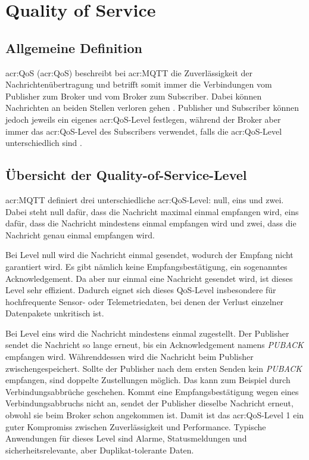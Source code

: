 \section{Quality of Service}
    \subsection{Allgemeine Definition}
        \acrlong{acr:QoS} (\acrshort{acr:QoS}) beschreibt bei \acrshort{acr:MQTT} die Zuverlässigkeit der Nachrichtenübertragung und betrifft somit immer die Verbindungen vom Publisher zum Broker und vom Broker zum Subscriber.
        Dabei können Nachrichten an beiden Stellen verloren gehen \autocite[22]{hivemqMQTTMQTT5}. Publisher und Subscriber können jedoch jeweils ein eigenes \acrshort{acr:QoS}-Level festlegen, während der Broker aber immer das \acrshort{acr:QoS}-Level des Subscribers verwendet, 
        falls die \acrshort{acr:QoS}-Level unterschiedlich sind \autocite[25]{hivemqMQTTMQTT5}. 
  
    \subsection{Übersicht der Quality-of-Service-Level}
        \acrshort{acr:MQTT} definiert drei unterschiedliche \acrshort{acr:QoS}-Level: null, eins und zwei. Dabei steht null dafür, dass die Nachricht maximal einmal empfangen wird, eins dafür, dass die Nachricht mindestens einmal empfangen wird und zwei, dass die Nachricht genau einmal empfangen wird. \autocite[120--122]{angewandteNetzwerktechnik}

        Bei Level null wird die Nachricht einmal gesendet, wodurch der Empfang nicht garantiert wird. Es gibt nämlich keine Empfangsbestätigung, ein sogenanntes Acknowledgement. Da aber nur einmal eine Nachricht gesendet wird, ist dieses Level sehr effizient. 
       Dadurch eignet sich dieses QoS-Level insbesondere für hochfrequente Sensor- oder Telemetriedaten, bei denen der Verlust einzelner Datenpakete unkritisch ist. \autocite[22]{hivemqMQTTMQTT5}

        Bei Level eins wird die Nachricht mindestens einmal zugestellt. Der Publisher sendet die Nachricht so lange erneut, bis ein Acknowledgement namens \textit{PUBACK} empfangen wird. Währenddessen wird die Nachricht beim Publisher zwischengespeichert. 
        Sollte der Publisher nach dem ersten Senden kein \textit{PUBACK} empfangen, sind doppelte Zustellungen möglich. 
        Das kann zum Beispiel durch Verbindungsabbrüche geschehen. Kommt eine Empfangsbestätigung wegen eines Verbindungsabbruchs nicht an, sendet der Publisher dieselbe Nachricht erneut, obwohl sie beim Broker schon angekommen ist.
        Damit ist das \acrshort{acr:QoS}-Level 1 ein guter Kompromiss zwischen Zuverlässigkeit und Performance. 
        Typische Anwendungen für dieses Level sind Alarme, Statusmeldungen und sicherheitsrelevante, aber Duplikat-tolerante Daten. \autocite[23]{hivemqMQTTMQTT5}

